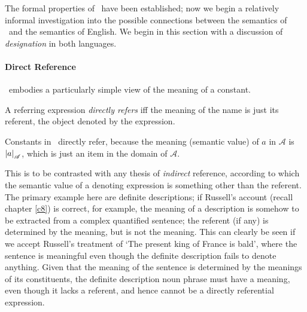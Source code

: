 The formal properties of \ltwo\ have been established; now we begin a relatively informal investigation into the possible connections between the semantics of \ltwo\ and the semantics of English.
We begin in this section with a discussion of \emph{designation} in both languages.

\paragraph{Direct Reference}

\ltwo\ embodies a particularly simple view of the meaning of a constant.
 \begin{definition}
 	A referring expression \emph{directly refers} iff the meaning of the name is just its referent, the object denoted by the expression.
 \end{definition}	
Constants in \ltwo\ directly refer, because the meaning (semantic value) of $a$ in $\mathscr{A}$ is $\left|a\right|_{\mathscr{A}}$, which is just an item in the domain of $\mathscr{A}$.


This is to be contrasted with any thesis of \emph{indirect} reference, according to which the semantic value of a denoting expression is something other than the referent. The primary example here are definite descriptions; if Russell's account (recall chapter \ref{c8}) is correct, for example,  the meaning of a description is somehow to be extracted from a complex quantified sentence; the referent (if any) is determined by the meaning, but is not the meaning. This can clearly be seen if we accept Russell's treatment of ‘The present king of France is bald’, where the sentence is meaningful even though the definite description fails to denote anything. Given that the meaning of the sentence is determined by the meanings of its constituents, the definite description noun phrase must have a meaning, even though it lacks a referent, and hence cannot be a directly referential expression.



